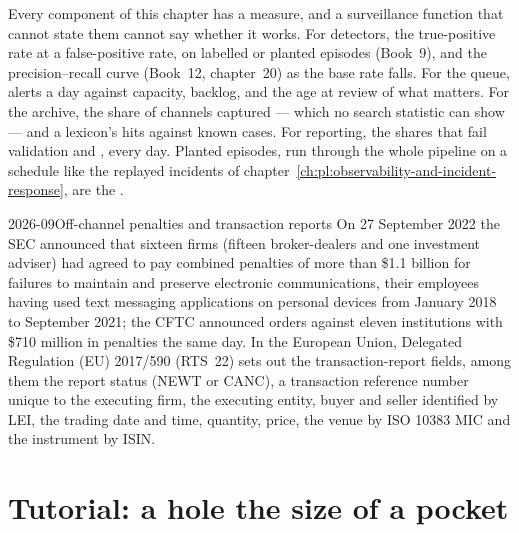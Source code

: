 Every component of this chapter has a measure, and a surveillance function that cannot state them cannot say whether it works. For detectors,
the true-positive rate at a false-positive rate, on labelled or planted episodes (Book~9), and the precision--recall curve (Book~12,
chapter~20) as the base rate falls. For the queue, alerts a day against capacity, backlog, and the age at review of what matters. For the
archive, the share of channels captured --- which no search statistic can show --- and a lexicon's hits against known cases. For reporting,
the shares that fail validation and , every day. Planted episodes, run through the whole pipeline on a schedule like the
replayed incidents of chapter~\ref{ch:pl:observability-and-incident-response}, are the .

\begin{dated}{2026-09}{Off-channel penalties and transaction reports}\label{dat:pl:surveillance-and-compliance-technology:rules}
On 27 September 2022 the SEC announced that sixteen firms (fifteen broker-dealers and one investment adviser) had agreed to pay combined
penalties of more than \$1.1 billion for failures to maintain and preserve electronic communications, their employees having used text
messaging applications on personal devices from January 2018 to September 2021; the CFTC announced orders against eleven institutions with
\$710 million in penalties the same day. In the European Union, Delegated Regulation (EU) 2017/590 (RTS~22) sets out the transaction-report
fields, among them the report status (NEWT or CANC), a transaction reference number unique to the executing firm, the executing entity, buyer
and seller identified by LEI, the trading date and time, quantity, price, the venue by ISO 10383 MIC and the instrument by ISIN.
\end{dated}

\section{Tutorial: a hole the size of a pocket}\label{tut:pl:surveillance-and-compliance-technology:tut}


